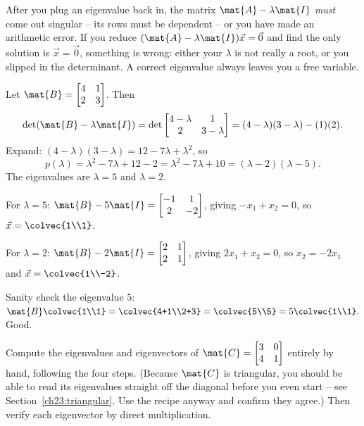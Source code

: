 \begin{trapbox}
After you plug an eigenvalue back in, the matrix $\mat{A}-\lambda\mat{I}$ \emph{must}
come out singular -- its rows must be dependent -- or you have made an arithmetic
error. If you reduce $(\mat{A}-\lambda\mat{I})\vec{x}=\vec{0}$ and find the only
solution is $\vec{x}=\vec{0}$, something is wrong: either your $\lambda$ is not
really a root, or you slipped in the determinant. A correct eigenvalue always
leaves you a free variable.
\end{trapbox}

\begin{example}
\label{ch23:ex-nonsym}
Let $\mat{B}=\begin{bmatrix}4 & 1\\ 2 & 3\end{bmatrix}$. Then
\[
  \det(\mat{B}-\lambda\mat{I})
  =\det\begin{bmatrix}4-\lambda & 1\\ 2 & 3-\lambda\end{bmatrix}
  =(4-\lambda)(3-\lambda)-(1)(2).
\]
Expand: $(4-\lambda)(3-\lambda)=12-7\lambda+\lambda^2$, so
\[
  p(\lambda)=\lambda^2-7\lambda+12-2=\lambda^2-7\lambda+10=(\lambda-2)(\lambda-5).
\]
The eigenvalues are $\lambda=5$ and $\lambda=2$.

For $\lambda=5$: $\mat{B}-5\mat{I}=\begin{bmatrix}-1&1\\2&-2\end{bmatrix}$, giving
$-x_1+x_2=0$, so $\vec{x}=\colvec{1\\1}$.

For $\lambda=2$: $\mat{B}-2\mat{I}=\begin{bmatrix}2&1\\2&1\end{bmatrix}$, giving
$2x_1+x_2=0$, so $x_2=-2x_1$ and $\vec{x}=\colvec{1\\-2}$.

Sanity check the eigenvalue $5$:
$\mat{B}\colvec{1\\1}=\colvec{4+1\\2+3}=\colvec{5\\5}=5\colvec{1\\1}.$ Good.
\end{example}

\begin{labbox}
Compute the eigenvalues and eigenvectors of
$\mat{C}=\begin{bmatrix}3 & 0\\ 4 & 1\end{bmatrix}$ entirely by hand, following
the four steps. (Because $\mat{C}$ is triangular, you should be able to read its
eigenvalues straight off the diagonal before you even start -- see
Section~\ref{ch23:triangular}. Use the recipe anyway and confirm they agree.)
Then verify each eigenvector by direct multiplication.
\end{labbox}

